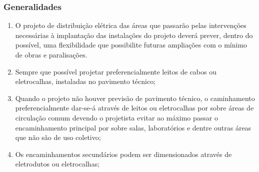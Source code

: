 \subsubsection{Generalidades}

\begin{enumerate}
	\item O projeto de distribuição elétrica das áreas que passarão pelas intervenções necessárias à implantação das instalações do projeto deverá prever, dentro do possível, uma flexibilidade que possibilite futuras ampliações com o mínimo de obras e paralisações. 
	
	\item Sempre que possível projetar preferencialmente leitos de cabos ou eletrocalhas, instaladas no pavimento técnico;
	
	\item Quando o projeto não houver previsão de pavimento técnico, o caminhamento preferencialmente dar-se-á através de leitos ou eletrocalhas por sobre áreas de circulação comum devendo o projetista evitar ao máximo passar o encaminhamento principal por sobre salas, laboratórios e dentre outras áreas que não são de uso coletivo;
	
	\item Os encaminhamentos secundários podem ser dimensionados através de eletrodutos ou eletrocalhas; 
	
\end{enumerate}